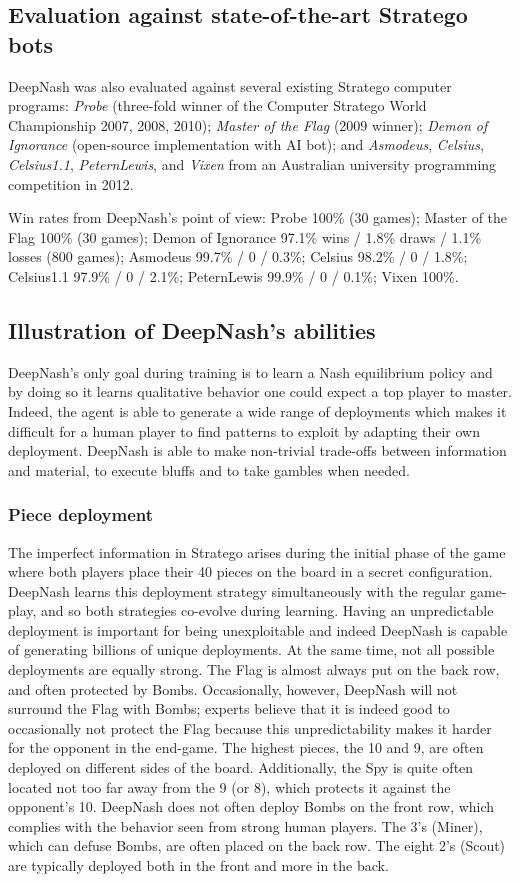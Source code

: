 \subsection{Evaluation against state-of-the-art Stratego bots}
DeepNash was also evaluated against several existing Stratego computer programs: \emph{Probe} (three-fold winner of the Computer Stratego World Championship 2007, 2008, 2010); \emph{Master of the Flag} (2009 winner); \emph{Demon of Ignorance} (open-source implementation with AI bot); and \emph{Asmodeus}, \emph{Celsius}, \emph{Celsius1.1}, \emph{PeternLewis}, and \emph{Vixen} from an Australian university programming competition in 2012.

Win rates from DeepNash's point of view: Probe 100\% (30 games); Master of the Flag 100\% (30 games); Demon of Ignorance 97.1\% wins / 1.8\% draws / 1.1\% losses (800 games); Asmodeus 99.7\% / 0 / 0.3\%; Celsius 98.2\% / 0 / 1.8\%; Celsius1.1 97.9\% / 0 / 2.1\%; PeternLewis 99.9\% / 0 / 0.1\%; Vixen 100\%.

\subsection{Illustration of DeepNash's abilities}
DeepNash's only goal during training is to learn a Nash equilibrium policy and by doing so it learns qualitative behavior one could expect a top player to master. Indeed, the agent is able to generate a wide range of deployments which makes it difficult for a human player to find patterns to exploit by adapting their own deployment. DeepNash is able to make non-trivial trade-offs between information and material, to execute bluffs and to take gambles when needed.

\subsubsection{Piece deployment}
The imperfect information in Stratego arises during the initial phase of the game where both players place their 40 pieces on the board in a secret configuration. DeepNash learns this deployment strategy simultaneously with the regular game-play, and so both strategies co-evolve during learning. Having an unpredictable deployment is important for being unexploitable and indeed DeepNash is capable of generating billions of unique deployments. At the same time, not all possible deployments are equally strong. The Flag is almost always put on the back row, and often protected by Bombs. Occasionally, however, DeepNash will not surround the Flag with Bombs; experts believe that it is indeed good to occasionally not protect the Flag because this unpredictability makes it harder for the opponent in the end-game. The highest pieces, the 10 and 9, are often deployed on different sides of the board. Additionally, the Spy is quite often located not too far away from the 9 (or 8), which protects it against the opponent's 10. DeepNash does not often deploy Bombs on the front row, which complies with the behavior seen from strong human players. The 3's (Miner), which can defuse Bombs, are often placed on the back row. The eight 2's (Scout) are typically deployed both in the front and more in the back.

